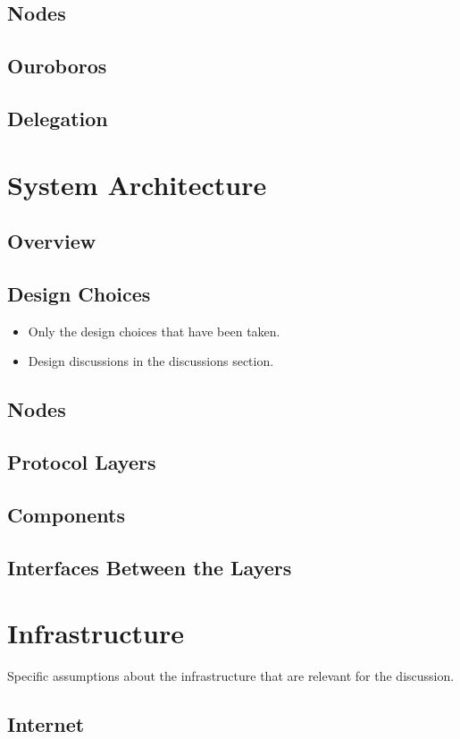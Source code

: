 \documentclass{report}
\theoremstyle{definition}{
  \newtheorem{lemma}{Lemma}[section] %
  \newtheorem{definition}[lemma]{Definition}
}
\theoremstyle{theorem}{
  \newtheorem{invariant}[lemma]{Invariant}
  \newtheorem{proofobligation}[lemma]{Proof Obligation}
}
\numberwithin{equation}{lemma}
\begin{document}
\section{Nodes}
\section{Ouroboros}
\section{Delegation}

\chapter{System Architecture}
\section{Overview}
\section{Design Choices}
\begin{itemize}
\item Only the design choices that have been taken.
\item Design discussions in the discussions section.
\end{itemize}
\section{Nodes}
\section{Protocol Layers}
\section{Components}
\section{Interfaces Between the Layers}

\chapter{Infrastructure}
Specific assumptions about the infrastructure that are relevant for the discussion.
\section{Internet}
\end{document}
